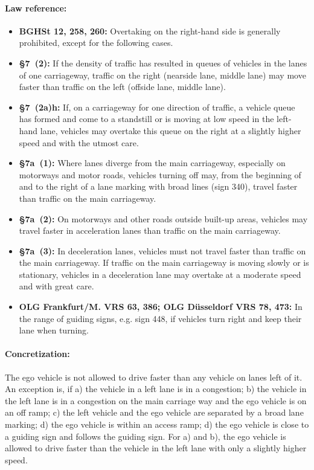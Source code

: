 \paragraph{Law reference:}
\begin{itemize}
	\item \textbf{BGHSt 12, 258, 260:}  Overtaking on the right-hand side is generally prohibited, except for the following cases.
	\item \textbf{\stvo \S 7~(2):} If the density of traffic has resulted in queues of vehicles in the lanes of one carriageway, traffic on the right (nearside lane, middle lane) may move faster than traffic on the left (offside lane, middle lane).
	
	\item \textbf{\stvo \S 7~(2a)h:} If, on a carriageway for one direction of traffic, a vehicle queue has formed and come to a standstill or is moving at low speed in the left-hand lane, vehicles may overtake this queue on the right at a slightly higher speed and with the utmost care.
	
	\item \textbf{\stvo \S 7a~(1):} Where lanes diverge from the main carriageway, especially on motorways and motor roads, vehicles turning off may, from the beginning of and to the right of a lane marking with broad lines (sign 340), travel faster than traffic on the main carriageway. 
	
	\item \textbf{\stvo \S 7a~(2):} On motorways and other roads outside built-up areas, vehicles may travel faster in  acceleration lanes than traffic on the main carriageway.
	
	\item \textbf{\stvo \S 7a~(3):} In deceleration lanes, vehicles must not travel faster than traffic on the main carriageway. If traffic on the main carriageway is moving slowly or is stationary, vehicles in a deceleration lane may overtake at a moderate speed and with great care.
	
	\item \textbf{OLG Frankfurt/M. VRS 63, 386; OLG Düsseldorf VRS 78, 473:} In the range of guiding signs, e.g. sign 448, if vehicles turn right and keep their lane when turning.
\end{itemize}

\paragraph{Concretization:} The ego vehicle is not allowed to drive faster than any vehicle on lanes left of it. An exception is, if a) the vehicle in a left lane is in a congestion; b) the vehicle in the left lane is in a congestion on the main carriage way and the ego vehicle is on an off ramp; c) the left vehicle and the ego vehicle are separated by a broad lane marking;  d) the ego vehicle is within an access ramp; d) the ego vehicle is close to a guiding sign and follows the  guiding sign. For a) and b), the ego vehicle is allowed to drive faster than the vehicle in the left lane with only a slightly higher speed. 

